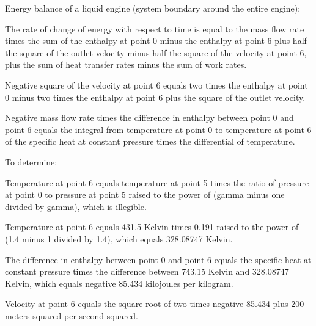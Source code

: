 Energy balance of a liquid engine (system boundary around the entire engine):

The rate of change of energy with respect to time is equal to the mass flow rate times the sum of the enthalpy at point 0 minus the enthalpy at point 6 plus half the square of the outlet velocity minus half the square of the velocity at point 6, plus the sum of heat transfer rates minus the sum of work rates.

Negative square of the velocity at point 6 equals two times the enthalpy at point 0 minus two times the enthalpy at point 6 plus the square of the outlet velocity.

Negative mass flow rate times the difference in enthalpy between point 0 and point 6 equals the integral from temperature at point 0 to temperature at point 6 of the specific heat at constant pressure times the differential of temperature.

To determine:

Temperature at point 6 equals temperature at point 5 times the ratio of pressure at point 0 to pressure at point 5 raised to the power of (gamma minus one divided by gamma), which is illegible.

Temperature at point 6 equals 431.5 Kelvin times 0.191 raised to the power of (1.4 minus 1 divided by 1.4), which equals 328.08747 Kelvin.

The difference in enthalpy between point 0 and point 6 equals the specific heat at constant pressure times the difference between 743.15 Kelvin and 328.08747 Kelvin, which equals negative 85.434 kilojoules per kilogram.

Velocity at point 6 equals the square root of two times negative 85.434 plus 200 meters squared per second squared.